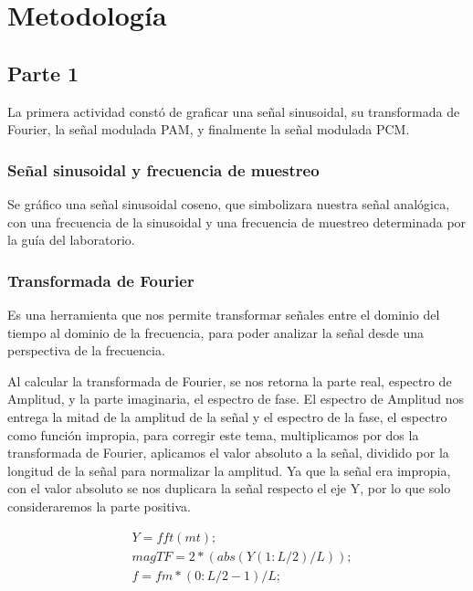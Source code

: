                                                                             \section{Metodología}\label{sec:metodologia}

\subsection{Parte 1}
La primera actividad constó de graficar una señal sinusoidal, su transformada de Fourier, la señal modulada PAM, y finalmente la señal modulada PCM.

\subsubsection{Señal sinusoidal y frecuencia de muestreo}
Se gráfico una señal sinusoidal coseno, que simbolizara nuestra señal analógica, con una frecuencia de la sinusoidal y una frecuencia de muestreo determinada por la guía del laboratorio.

\subsubsection{Transformada de Fourier}
Es una herramienta que nos permite transformar señales entre el dominio del tiempo al dominio de la frecuencia, para poder analizar la señal desde una perspectiva de la frecuencia.

Al calcular la transformada de Fourier, se nos retorna la parte real, espectro de Amplitud, y la parte imaginaria, el espectro de fase. El espectro de Amplitud nos entrega la mitad de la amplitud de la señal y el espectro de la fase, el espectro como función impropia, para corregir este tema, multiplicamos por dos la transformada de Fourier, aplicamos el valor absoluto a la señal, dividido por la longitud de la señal para normalizar la amplitud. Ya que la señal era impropia, con el valor absoluto se nos duplicara la señal respecto el eje Y, por lo que solo consideraremos la parte positiva.

\begin{equation} \label{eq:Transformada_de_fourier}
\begin{split} 
&Y=fft(mt); \\
&magTF = 2*(abs(Y(1:L/2)/L)); \\
&f = fm*(0:L/2-1)/L; \\   
\end{split}
\end{equation}





